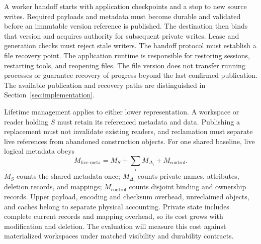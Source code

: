 A worker handoff starts with application checkpoints and a stop to new source
writes. Required payloads and metadata must become durable and validated
before an immutable version reference is published. The destination then
binds that version and acquires authority for subsequent private writes.
Lease and generation checks must reject stale writers. The handoff protocol
must establish a file recovery point. The application runtime is responsible
for restoring sessions, restarting tools, and reopening files. The file version
does not transfer running processes or guarantee recovery of progress beyond
the last confirmed publication. The available
publication and recovery paths are distinguished in
Section~\ref{sec:implementation}.

Lifetime management applies to either lower representation. A workspace or
reader holding $S$ must retain its referenced metadata and data. Publishing a
replacement must not invalidate existing readers, and reclamation must
separate live references from abandoned construction objects. For one shared
baseline, live logical metadata obeys
\begin{equation}
M_{\mathrm{live\text{-}meta}}=M_S+\sum_i M_{\Delta_i}+M_{\mathrm{control}}.
\end{equation}
$M_S$ counts the shared metadata once; $M_{\Delta_i}$ counts private names,
attributes, deletion records, and mappings; $M_{\mathrm{control}}$ counts
disjoint binding and ownership records. Upper payload, encoding and checksum overhead,
unreclaimed objects, and caches belong to separate physical accounting.
Private state includes complete current records and mapping overhead, so its
cost grows with modification and deletion. The evaluation will measure this cost
against materialized workspaces under matched visibility and durability
contracts.
